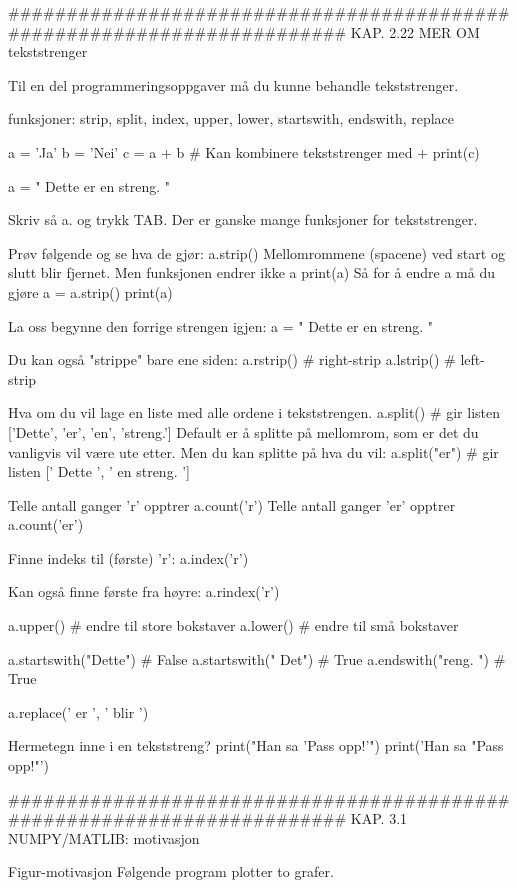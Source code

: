 \documentclass[a4paper,11pt,utf8]{book}
\begin{document}
######################################################################## 
KAP. 2.22  MER OM tekststrenger

Til en del programmeringsoppgaver må du kunne behandle tekststrenger.

funksjoner: strip, split, index, upper, lower, startswith, endswith, replace

a = 'Ja'
b = 'Nei'
c = a + b    # Kan kombinere tekststrenger med +
print(c)

a = " Dette er en streng.  "

Skriv så a. og trykk TAB. Der er ganske mange funksjoner for tekststrenger.

Prøv følgende og se hva de gjør: 
a.strip()
Mellomrommene (spacene) ved start og slutt blir fjernet.
Men funksjonen endrer ikke a
print(a)
Så for å endre a må du gjøre 
a = a.strip() 
print(a)


La oss begynne den forrige strengen igjen: 
a = " Dette er en streng.  "

Du kan også "strippe" bare ene siden:
a.rstrip()    # right-strip
a.lstrip()    # left-strip


Hva om du vil lage en liste med alle ordene i tekststrengen.
a.split()       # gir listen ['Dette', 'er', 'en', 'streng.']
Default er å splitte på mellomrom, som er det du vanligvis vil være ute etter. 
Men du kan splitte på hva du vil:
a.split("er")   # gir listen [' Dette ', ' en streng.  ']


Telle antall ganger 'r' opptrer
a.count('r')
Telle antall ganger 'er' opptrer
a.count('er')


Finne indeks til (første) 'r':
a.index('r')

Kan også finne første fra høyre:
a.rindex('r')

a.upper()  # endre til store bokstaver
a.lower()  # endre til små bokstaver

a.startswith("Dette")  # False
a.startswith(" Det")   # True
a.endswith("reng.  ")      # True

a.replace(' er ', ' blir ')


Hermetegn inne i en tekststreng? 
print("Han sa 'Pass opp!'")
print('Han sa "Pass opp!"')









######################################################################## 
KAP. 3.1  NUMPY/MATLIB: motivasjon

Figur-motivasjon
Følgende program plotter to grafer. 
\end{document}
